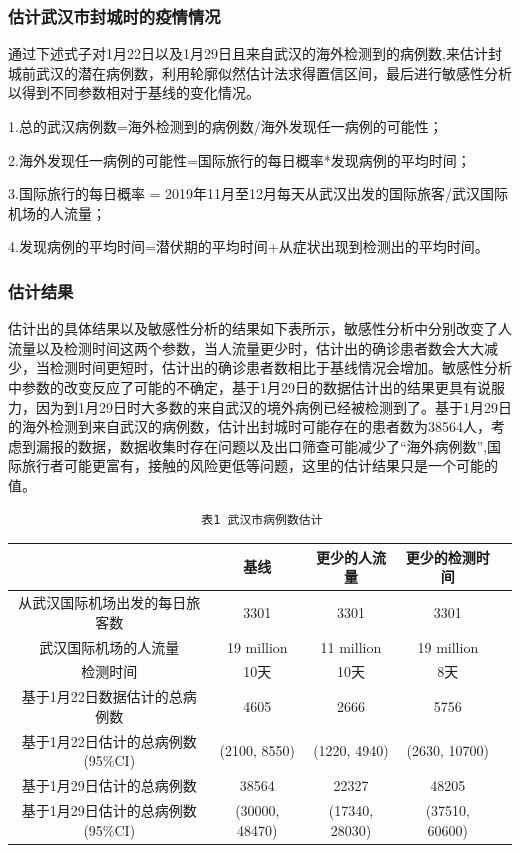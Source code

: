 \documentclass[12pt,hyperref,]{ctexart}
\begin{document}
\hypertarget{ux4f30ux8ba1ux6b66ux6c49ux5e02ux5c01ux57ceux65f6ux7684ux75abux60c5ux60c5ux51b5}{%
\subsubsection{估计武汉市封城时的疫情情况}\label{ux4f30ux8ba1ux6b66ux6c49ux5e02ux5c01ux57ceux65f6ux7684ux75abux60c5ux60c5ux51b5}}

通过下述式子对1月22日以及1月29日且来自武汉的海外检测到的病例数,来估计封城前武汉的潜在病例数，利用轮廓似然估计法求得置信区间，最后进行敏感性分析以得到不同参数相对于基线的变化情况。

1.总的武汉病例数=海外检测到的病例数/海外发现任一病例的可能性；

2.海外发现任一病例的可能性=国际旅行的每日概率*发现病例的平均时间；

3.国际旅行的每日概率 =
2019年11月至12月每天从武汉出发的国际旅客/武汉国际机场的人流量；

4.发现病例的平均时间=潜伏期的平均时间+从症状出现到检测出的平均时间。

\hypertarget{ux4f30ux8ba1ux7ed3ux679c}{%
\subsubsection{估计结果}\label{ux4f30ux8ba1ux7ed3ux679c}}

估计出的具体结果以及敏感性分析的结果如下表所示，敏感性分析中分别改变了人流量以及检测时间这两个参数，当人流量更少时，估计出的确诊患者数会大大减少，当检测时间更短时，估计出的确诊患者数相比于基线情况会增加。敏感性分析中参数的改变反应了可能的不确定，基于1月29日的数据估计出的结果更具有说服力，因为到1月29日时大多数的来自武汉的境外病例已经被检测到了。基于1月29日的海外检测到来自武汉的病例数，估计出封城时可能存在的患者数为38564人，考虑到漏报的数据，数据收集时存在问题以及出口筛查可能减少了``海外病例数'',国际旅行者可能更富有，接触的风险更低等问题，这里的估计结果只是一个可能的值。

\begin{verbatim}
                           表1 武汉市病例数估计
\end{verbatim}

\begin{longtable}[]{@{}ccccc@{}}
\toprule
& 基线 & 更少的人流量 & 更少的检测时间 &\tabularnewline
\midrule
\endhead
从武汉国际机场出发的每日旅客数 & 3301 & 3301 & 3301 &\tabularnewline
武汉国际机场的人流量 & 19 million & 11 million & 19 million
&\tabularnewline
检测时间 & 10天 & 10天 & 8天 &\tabularnewline
基于1月22日数据估计的总病例数 & 4605 & 2666 & 5756 &\tabularnewline
基于1月22日估计的总病例数(95\%CI) & (2100, 8550) & (1220, 4940) & (2630,
10700) &\tabularnewline
基于1月29日估计的总病例数 & 38564 & 22327 & 48205 &\tabularnewline
基于1月29日估计的总病例数(95\%CI) & (30000, 48470) & (17340, 28030) &
(37510, 60600) &\tabularnewline
\bottomrule
\end{longtable}
\end{document}
